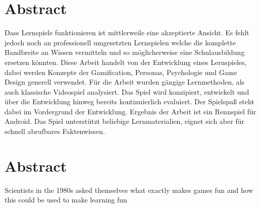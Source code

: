 \section*{Abstract}
Dass Lernspiele funktionieren ist mittlerweile eine akzeptierte Ansicht. Es fehlt jedoch noch an professionell umgesetzten Lernspielen welche die komplette Bandbreite an Wissen vermitteln und so möglicherweise eine Schulausbildung ersetzen könnten.
Diese Arbeit handelt von der Entwicklung eines Lernspieles, dabei werden Konzepte der Gamification, Personas, Psychologie und Game Design generell verwendet. Für die Arbeit wurden gängige Lernmethoden, als auch klassische Videospiel analysiert. Das Spiel wird konzipiert, entwickelt und über die Entwicklung hinweg bereits kontinuierlich evaluiert. Der Spielspaß steht dabei im Vordergrund der Entwicklung.
Ergebnis der Arbeit ist ein Rennspiel für Android. Das Spiel unterstützt beliebige Lernmaterialien, eignet sich aber für schnell abrufbares Faktenwissen.

\vfill

\section*{Abstract}
Scientists in the 1980s asked themselves what exactly makes games fun and how this could be used to make learning fun

\vfill\newpage
